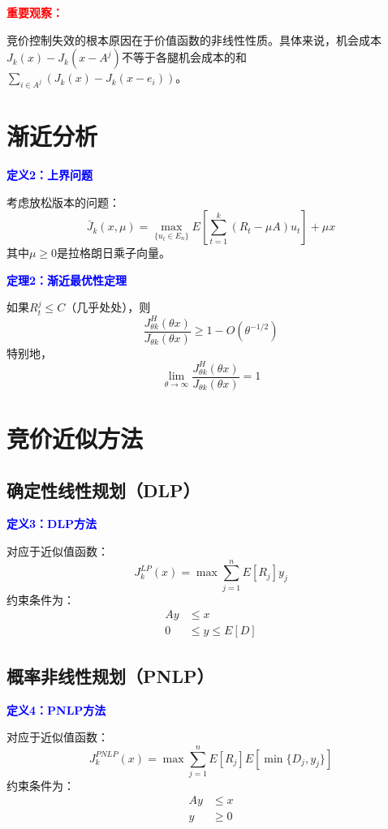 \documentclass[12pt,a4paper]{article}
\begin{document}
\textcolor{red}{\textbf{重要观察：}}

竞价控制失效的根本原因在于价值函数的非线性性质。具体来说，机会成本$J_k(x) - J_k(x - A^j)$不等于各腿机会成本的和$\sum_{i \in A^j}(J_k(x) - J_k(x - e_i))$。

\section{渐近分析}

\textcolor{blue}{\textbf{定义2：上界问题}}

考虑放松版本的问题：
\[
\bar{J}_k(x,\mu) = \max_{\{u_t \in E_n\}} E\left[\sum_{t=1}^k (R_t - \mu A) u_t\right] + \mu x
\]
其中$\mu \geq 0$是拉格朗日乘子向量。

\textcolor{blue}{\textbf{定理2：渐近最优性定理}}

如果$R_t^j \leq C$（几乎处处），则
\[
\frac{J_{\theta k}^H(\theta x)}{J_{\theta k}(\theta x)} \geq 1 - O(\theta^{-1/2})
\]
特别地，
\[
\lim_{\theta \to \infty} \frac{J_{\theta k}^H(\theta x)}{J_{\theta k}(\theta x)} = 1
\]

\section{竞价近似方法}

\subsection{确定性线性规划（DLP）}

\textcolor{blue}{\textbf{定义3：DLP方法}}

对应于近似值函数：
\[
J_k^{LP}(x) = \max \sum_{j=1}^n E[R_j] y_j
\]
约束条件为：
\begin{align}
A y &\leq x \\
0 &\leq y \leq E[D]
\end{align}

\subsection{概率非线性规划（PNLP）}

\textcolor{blue}{\textbf{定义4：PNLP方法}}

对应于近似值函数：
\[
J_k^{PNLP}(x) = \max \sum_{j=1}^n E[R_j] E[\min\{D_j, y_j\}]
\]
约束条件为：
\begin{align}
A y &\leq x \\
y &\geq 0
\end{align}
\end{document}
